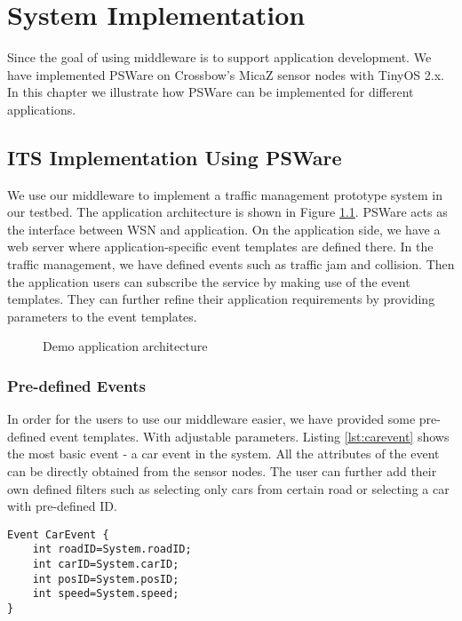 \chapter{System Implementation}
\label{chapter:implementation}
Since the goal of using middleware is to support application development. We have implemented PSWare on Crossbow's MicaZ sensor nodes with TinyOS 2.x. In this chapter we illustrate how PSWare can be implemented for different applications.

\section{ITS Implementation Using PSWare}
We use our middleware to implement a traffic management prototype system in our testbed. The application architecture is shown in Figure \ref{fig:appdemo}. PSWare acts as the interface between WSN and application. On the application side, we have a web server where application-specific event templates are defined there. In the traffic management, we have defined events such as traffic jam and collision. Then the application users can subscribe the service by making use of the event templates. They can further refine their application requirements by providing parameters to the event templates.

\begin{figure}
\centering
{}
\caption{Demo application architecture}
\label{fig:appdemo}
\end{figure}

\subsection{Pre-defined Events}
In order for the users to use our middleware easier, we have provided some pre-defined event templates. With adjustable parameters. Listing \ref{lst:carevent} shows the most basic event - a car event in the system. All the attributes of the event can be directly obtained from the sensor nodes. The user can further add their own defined filters such as selecting only cars from certain road or selecting a car with pre-defined ID.

\begin{lstlisting}[caption=Car event, label=lst:carevent]
Event CarEvent {
	int roadID=System.roadID;
	int carID=System.carID;
	int posID=System.posID;
	int speed=System.speed;
}
\end{lstlisting}

